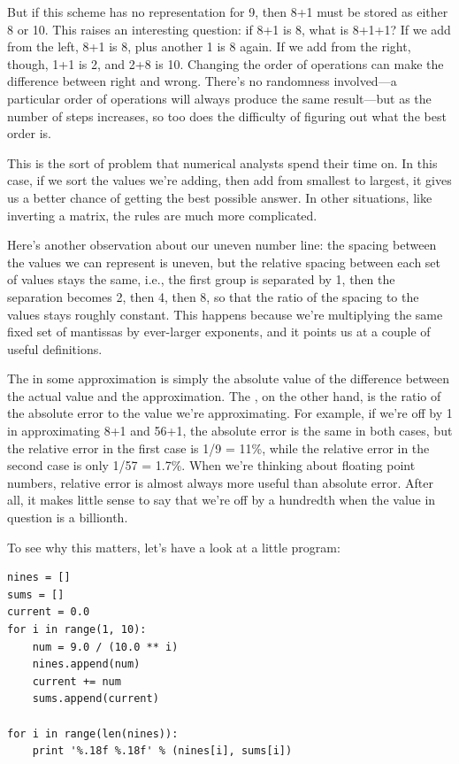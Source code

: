 \documentclass{book}
\begin{document}
But if this scheme has no representation for 9, then 8+1 must be stored
as either 8 or 10. This raises an interesting question: if 8+1 is 8,
what is 8+1+1? If we add from the left, 8+1 is 8, plus another 1 is 8
again. If we add from the right, though, 1+1 is 2, and 2+8 is 10.
Changing the order of operations can make the difference between right
and wrong. There's no randomness involved---a particular order of
operations will always produce the same result---but as the number of
steps increases, so too does the difficulty of figuring out what the
best order is.

This is the sort of problem that numerical analysts spend their time on.
In this case, if we sort the values we're adding, then add from smallest
to largest, it gives us a better chance of getting the best possible
answer. In other situations, like inverting a matrix, the rules are much
more complicated.

Here's another observation about our uneven number line: the spacing
between the values we can represent is uneven, but the relative spacing
between each set of values stays the same, i.e., the first group is
separated by 1, then the separation becomes 2, then 4, then 8, so that
the ratio of the spacing to the values stays roughly constant. This
happens because we're multiplying the same fixed set of mantissas by
ever-larger exponents, and it points us at a couple of useful
definitions.

The  in some approximation is
simply the absolute value of the difference between the actual value and
the approximation. The , on
the other hand, is the ratio of the absolute error to the value we're
approximating. For example, if we're off by 1 in approximating 8+1 and
56+1, the absolute error is the same in both cases, but the relative
error in the first case is 1/9 = 11\%, while the relative error in the
second case is only 1/57 = 1.7\%. When we're thinking about floating
point numbers, relative error is almost always more useful than absolute
error. After all, it makes little sense to say that we're off by a
hundredth when the value in question is a billionth.

To see why this matters, let's have a look at a little program:

\begin{verbatim}
nines = []
sums = []
current = 0.0
for i in range(1, 10):
    num = 9.0 / (10.0 ** i)
    nines.append(num)
    current += num
    sums.append(current)

for i in range(len(nines)):
    print '%.18f %.18f' % (nines[i], sums[i])
\end{verbatim}
\end{document}
